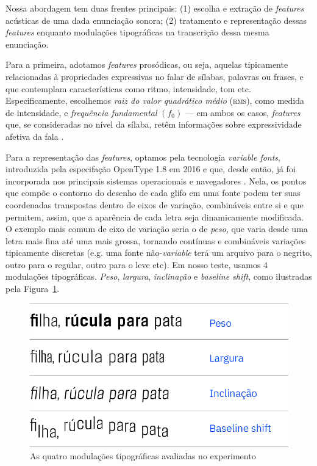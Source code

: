 \documentclass[11pt]{article}
\begin{document}
  Nossa abordagem tem duas frentes principais: (1) escolha e extração de {\itshape features} acústicas de uma dada enunciação sonora; (2) tratamento e representação dessas {\itshape features} enquanto modulações tipográficas na transcrição dessa mesma enunciação.
  
  Para a primeira, adotamos {\itshape features} prosódicas, ou seja, aquelas tipicamente relacionadas à propriedades expressivas no falar de sílabas, palavras ou frases, e que contemplam características como ritmo, intensidade, tom etc. Especificamente, escolhemos {\itshape raiz do valor quadrático médio} \textsc{(rms)}, como medida de intensidade, e {\itshape frequência fundamental} $(f_0)$ --- em ambos os casos, {\itshape features} que, se consideradas no nível da sílaba, retêm informações sobre expressividade afetiva da fala \cite{rao2010characterization}.
  
  Para a representação das {\itshape features}, optamos pela tecnologia {\itshape variable fonts}, introduzida pela especifação OpenType 1.8\cite{varfontssepcs} em 2016 e que, desde então, já foi incorporada nos principais sistemas operacionais e navegadores \cite{varfontossupport}. Nela, os pontos que compõe o contorno do desenho de cada glifo em uma fonte podem ter suas coordenadas transpostas dentro de eixos de variação, combináveis entre si e que permitem, assim, que a aparência de cada letra seja dinamicamente modificada. O exemplo mais comum de eixo de variação seria o de {\itshape peso}, que varia desde uma letra mais fina até uma mais grossa, tornando contínuas e combináveis variações tipicamente discretas (e.g. uma fonte não-{\itshape variable} terá um arquivo para o negrito, outro para o regular, outro para o leve etc). Em nosso teste, usamos 4 modulações tipográficas. {\itshape Peso}, {\itshape largura}, {\itshape inclinação} e {\itshape baseline shift}, como ilustradas pela Figura~\ref{fig:type_modulations}.
  
\begin{figure}[H]
     {\centering
    \includegraphics[width=\linewidth]{fig/modulacoes.png}
     \caption{As quatro modulações tipográficas avaliadas no experimento}
     \label{fig:type_modulations}\par}
\end{figure}
  
\end{document}
